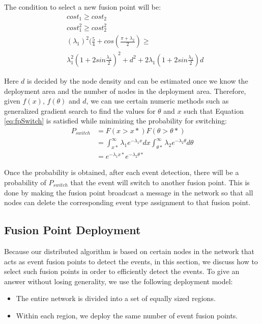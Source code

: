 The condition to select a new fusion point will be:
\begin{align}
&cost_1\geq cost_2\nonumber \\
&cost_1^2\geq cost_2^2\nonumber \\
&({\lambda}_1)^2(\frac{5}{4}+cos(\frac{\pi+{\lambda}_2}{2})\geq\nonumber \\ &{\lambda}_1^2(1+2sin\frac{{\lambda}_2}{2})^2+d^2+2{\lambda}_1(1+2sin\frac{{\lambda}_2}{2})d
\label{eq:fpSwitch}
\end{align}

Here \(d\) is decided by the node density and can be estimated once we know the deployment area and the number of nodes in the deployment area. Therefore, given \(f(x)\), \(f(\theta)\) and \(d\), we can use certain numeric methods such as generalized gradient search to find the values for \(\theta\) and \(x\) such that Equation \ref{eq:fpSwitch} is satisfied while minimizing the probability for switching:
\begin{align*}
P_{switch}&=F(x>x*)F(\theta>\theta *)\\
&=\int_{x*}^{\infty}{\lambda}_1e^{-{\lambda}_1x}dx\int_{\theta *}^{\infty}{\lambda}_2e^{-{\lambda}_2\theta}d\theta\\
&=e^{-{\lambda}_1x*}e^{-{\lambda}_2\theta *}
\end{align*}

Once the probability is obtained, after each event detection, there will be a probability of \(P_{switch}\) that the event will switch to another fusion point. This is done by making the fusion point broadcast a message in the network so that all nodes can delete the corresponding event type assignment to that fusion point.

\subsection{Fusion Point Deployment}
Because our distributed algorithm is based on certain nodes in the network that acts as event fusion points to detect the events, in this section, we discuss how to select such fusion points in order to efficiently detect the events. To give an answer without losing generality, we use the following deployment model:
\begin{itemize}
\item The entire network is divided into a set of equally sized regions.
\item Within each region, we deploy the same number of event fusion points. 
\end{itemize}

